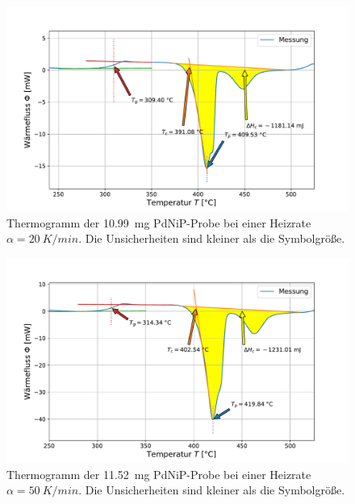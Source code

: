 \documentclass[
	a4paper,
	12pt,
	pagesize,
	ngerman
]{scrartcl}
\begin{document}
	\begin{figure}[H]
			\includegraphics[width=\linewidth]{img/Kalorimetrie_pdnip_20.pdf}
			\caption{
				Thermogramm der \SI{10.99}{mg} PdNiP-Probe bei einer Heizrate $\alpha = \SI{20}{K/min}$.
			Die Unsicherheiten sind kleiner als die Symbolgröße.
			}
			\label{fig_themo_pdnip_20}
		\end{figure}
	\begin{figure}[H]
			\includegraphics[width=\linewidth]{img/Kalorimetrie_pdnip_50.pdf}
			\caption{
				Thermogramm der \SI{11.52}{mg} PdNiP-Probe bei einer Heizrate $\alpha = \SI{50}{K/min}$.
			Die Unsicherheiten sind kleiner als die Symbolgröße.
			}
			\label{fig_themo_pdnip_50}
		\end{figure}
\end{document}
